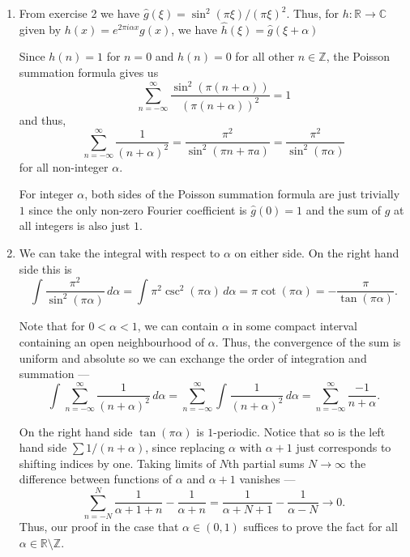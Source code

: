 \documentclass[12 pt, letterpaper]{hmcpset}
\begin{document}
\begin{solution}
	\begin{enumerate}
		\item From exercise 2 we have $\hat{g}(\xi) = \sin^{2}{(\pi \xi)} / (\pi \xi)^{2}$. Thus, for $h : \mathbb{R} \to \mathbb{C}$ given by $h(x) = e^{2 \pi i \alpha x} g(x)$, we have $\hat{h}(\xi) = \hat{g}(\xi + \alpha)$

			Since $h(n) = 1$ for $n = 0$ and $h(n) = 0$ for all other $n \in \mathbb{Z}$, the Poisson summation formula gives us
			\[
				\sum_{n = -\infty}^{\infty} \frac{\sin^{2}{(\pi (n + \alpha))}}{(\pi (n + \alpha))^{2}} = 1
			\]
			and thus,
			\[
				\sum_{n = -\infty}^{\infty} \frac{1}{(n + \alpha)^{2}} = \frac{\pi^{2}}{\sin^{2}{(\pi n + \pi a)}} = \frac{\pi^{2}}{\sin^{2}(\pi \alpha)}
			\]
			for all non-integer $\alpha$.

			For integer $\alpha$, both sides of the Poisson summation formula are just trivially $1$ since the only non-zero Fourier coefficient is $\hat{g}(0) = 1$ and the sum of $g$ at all integers is also just $1$.

		\item We can take the integral with respect to $\alpha$ on either side. On the right hand side this is
			\[
				\int \frac{\pi^{2}}{\sin^{2}{(\pi \alpha)}} \, d\alpha = \int_{} \pi^{2} \csc^{2}{(\pi \alpha)} \, d\alpha = \pi \cot{(\pi \alpha)} = - \frac{\pi}{\tan{(\pi \alpha)}}.
			\]

			Note that for $0 < \alpha < 1$, we can contain $\alpha$ in some compact interval containing an open neighbourhood of $\alpha$. Thus, the convergence of the sum is uniform and absolute so we can exchange the order of integration and summation ---
			\[
				\int_{} \sum_{n = - \infty}^{\infty} \frac{1}{(n + \alpha)^{2}} \, d\alpha = \sum_{n = -\infty}^{\infty} \int_{} \frac{1}{(n + \alpha)^{2}} \, d\alpha = \sum_{n = -\infty}^{\infty} \frac{-1}{n + \alpha}.
			\]

			On the right hand side $\tan{(\pi \alpha)}$ is $1$-periodic. Notice that so is the left hand side $\sum 1 / (n + \alpha)$, since replacing $\alpha$ with $\alpha + 1$ just corresponds to shifting indices by one. Taking limits of $N$th partial sums $N \to \infty$ the difference between functions of $\alpha$ and $\alpha + 1$ vanishes ---
			\[
				\sum_{n = - N}^{N} \frac{1}{\alpha + 1 + n} - \frac{1}{\alpha + n} = \frac{1}{\alpha + N + 1} - \frac{1}{\alpha - N} \to 0.
			\]
			Thus, our proof in the case that $\alpha \in (0, 1)$ suffices to prove the fact for all $\alpha \in \mathbb{R} \setminus \mathbb{Z}$.
	\end{enumerate}
\end{solution}
\end{document}
